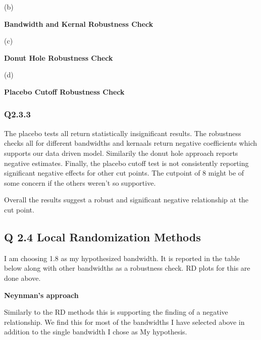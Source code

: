 \documentclass[11pt]{article}
\begin{document}
(b)
\begin{center}
	\centering
	\textbf{Bandwidth and Kernal Robustness Check }\par\medskip
	\scalebox{.9}{
		
	}
\end{center}

(c)

\begin{center}
	\centering
	\textbf{Donut Hole Robustness Check }\par\medskip
	\scalebox{1}{
		
	}
\end{center}

(d)

\begin{center}
	\centering
	\textbf{Placebo Cutoff Robustness Check }\par\medskip
	\scalebox{.9}{
		
	}
\end{center}
\subsubsection{Q2.3.3}

The placebo tests all return statistically insignificant results. The robustness checks all for different bandwidths and kernaals return negative coefficients which supports our data driven model. Similarily the donut hole approach reports negative estimates. Finally, the placebo cutoff test is not consistently reporting significant negative effects for other cut points. The cutpoint of 8 might be of some concern if the others weren't so supportive.  \par 
Overall the results suggest a robust and significant negative relationship at the cut point. 

\subsection{Q 2.4 Local Randomization Methods }

I am choosing 1.8 as my hypothesized bandwidth. It is reported in the table below along with other bandwidths as a robustness check. RD plots for this are done above. 

\begin{center}
	\centering
	\textbf{Neynman's approach }\par\medskip
	\scalebox{.9}{
		
	}
\end{center}

Similarly to the RD methods this is supporting the finding of a negative relationship. We find this for most of the bandwidths I have selected above in addition to the single bandwidth I chose as My hypothesis. 
\end{document}

